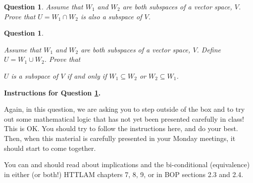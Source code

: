 \documentclass[12pt]{article}
\newtheorem{question}[thm]{Question}
\newcommand{\union}{\cup}
\newcommand{\intersect}{\cap}
\begin{document}
\begin{question}
	\normalfont
	
	Assume that $W_1$ and $W_2$ are both subspaces of a vector space, $V$.  Prove that $U=W_1\intersect W_2$ is also a subspace of $V$.
	
	
\end{question}


\vspace{0.4cm}







\begin{question}\label{que:SubspaceUnion}
	\normalfont
	
	Assume that $W_1$ and $W_2$ are both subspaces of a vector space, $V$.  Define $U=W_1\union W_2$.  Prove that 
	\begin{center}
		$U$ is a subspace of $V$ if and only if $W_1\subseteq W_2$ or $W_2\subseteq W_1$.  
	\end{center}
	
\end{question}


\textbf{Instructions for Question \ref{que:SubspaceUnion}.}

Again, in this question, we are asking you to step outside of the box and to try out some mathematical logic that has not yet been presented carefully in class!  This is OK.  You should try to follow the instructions here, and do your best.  Then, when this material is carefully presented in your Monday meetings, it should start to come together.

You can and should read about implications and the bi-conditional (equivalence) in either (or both!) HTTLAM chapters 7, 8, 9, or in BOP sections 2.3 and 2.4.
\end{document}
